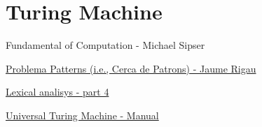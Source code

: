 \documentclass[12pt,a4paper]{report}
\begin{document}
\chapter{Turing Machine}



\begin{multicols}{2}
\end{multicols}



\begin{thebibliography}{9}
Fundamental of Computation - Michael Sipser
 
\hyperlink{http://ima.udg.edu/~rigau/FC/FC_patterns.pdf}{Problema Patterns (i.e., Cerca de Patrons) - Jaume Rigau} 

\hyperlink{http://ima.udg.edu/~rigau/FC/MFAP.pdf}{Lexical analisys - part 4}

\hyperlink{http://ima.udg.edu/~rigau/FC/utm_read_me.pdf}{Universal Turing Machine - Manual}

\end{thebibliography}

\printindex
\end{document}

